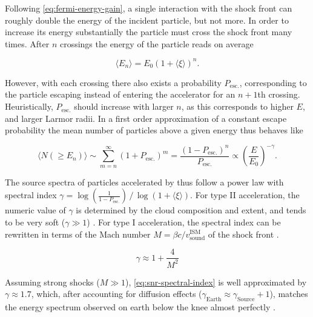 Following \cref{eq:fermi-energy-gain}, a single interaction with the shock 
front can roughly double the energy of the incident particle, but not more. In 
order to increase its energy substantially the particle must cross the shock
front many times. After $n$ crossings the energy of the particle reads on 
average 

\begin{equation}
\label{eq:energy-per-crossing}
\langle E_n \rangle = E_0\left( 1 + \langle\xi\rangle \right)^n. 
\end{equation}

However, with each crossing there also exists a probability $P_\mathrm{esc.}$, 
corresponding to the particle escaping instead of entering the accelerator for 
an $n+1$th crossing. Heuristically, $P_\mathrm{esc.}$ should increase with 
larger $n$, as this corresponds to higher $E$, and larger Larmor radii. In a 
first order approximation of a constant escape probability the mean number of 
particles above a given energy thus behaves like 

\begin{equation}
	\langle N(\geq E_n)\rangle \sim \sum\limits_{m=n}^\infty 
	\left( 1 + P_\mathrm{esc.}\right)^m 
	= \frac{\left( 1-P_\mathrm{esc.} \right)^n}{P_\mathrm{esc.}}
	\propto \left(\frac{E}{E_0}\right)^{-\gamma}.
\end{equation}

The source spectra of particles accelerated by \SNRs thus follow a power law 
with spectral index $\gamma=\log\left(\frac{1}{1-P_\mathrm{esc.}}\right)\,/\,
\log\left(1+\langle\xi\rangle\right)$. For type II acceleration, the numeric 
value of $\gamma$ is determined by the cloud composition and extent, and tends 
to be very soft ($\gamma\gg1$) \cite{davisModifiedFermiMechanism1956}. For type
I acceleration, the spectral index can be rewritten in terms of the Mach number
$M=\beta c/v_\mathrm{sound}^\mathrm{ISM}$ of the shock front
\cite{gaisserCosmicRaysParticle2016}.

\begin{equation}
	\label{eq:snr-spectral-index}
	\gamma \approx 1 + \frac{4}{M^2}
\end{equation}

Assuming strong shocks ($M\gg1$), \cref{eq:snr-spectral-index} is well 
approximated by $\gamma\approx1.7$, which, after accounting for diffusion 
effects ($\gamma_\mathrm{Earth}\approx\gamma_\mathrm{Source}+1$), matches the 
energy spectrum observed on earth below the knee almost perfectly 
\cite{baloghPhysicsCollisionlessShocks2013}.

